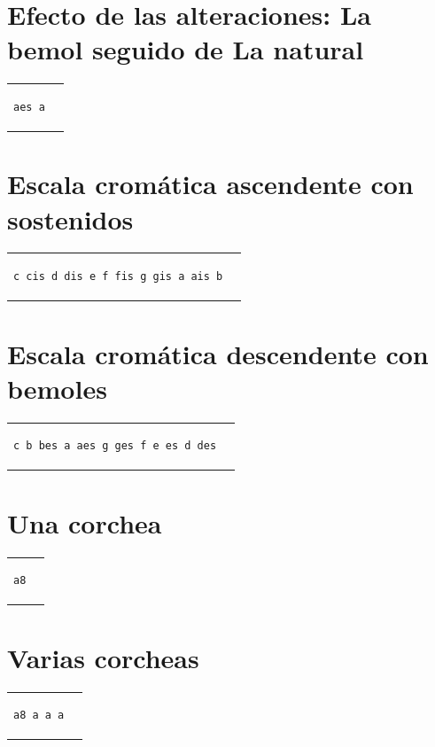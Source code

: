 \documentclass[10pt,a4paper,oneside,headinclude,titlepage]{scrartcl}
\begin{document}
\section*{Efecto de las alteraciones: La bemol seguido de La natural}
\begin{tabular}{m{2cm}m{2cm}}
\begin{verbatim}
aes a
\end{verbatim}
&
\begin[fragment,relative=2,notime]{lilypond}
aes a
\end{lilypond}
\end{tabular}

\section*{Escala cromática ascendente con sostenidos}
\begin{tabular}{m{6cm}m{2cm}}
\begin{verbatim}
c cis d dis e f fis g gis a ais b
\end{verbatim}
&
\begin[fragment,relative=1,notime]{lilypond}
c cis d dis e f fis g gis a ais b
\end{lilypond}
\end{tabular}

\section*{Escala cromática descendente con bemoles}
\begin{tabular}{m{6cm}m{2cm}}
\begin{verbatim}
c b bes a aes g ges f e es d des
\end{verbatim}
&
\begin[fragment,relative=2,notime]{lilypond}
c b bes a aes g ges f e es d des
\end{lilypond}
\end{tabular}

\section*{Una corchea}
\begin{tabular}{m{2cm}m{2cm}}
\begin{verbatim}
a8
\end{verbatim}
&
\begin[fragment,relative=2,notime]{lilypond}
a8
\end{lilypond}
\end{tabular}

\section*{Varias corcheas}
\begin{tabular}{m{2cm}m{2cm}}
\begin{verbatim}
a8 a a a
\end{verbatim}
&
\begin[fragment,relative=2,notime]{lilypond}
a8 a a a
\end{lilypond}
\end{tabular}
\end{document}
